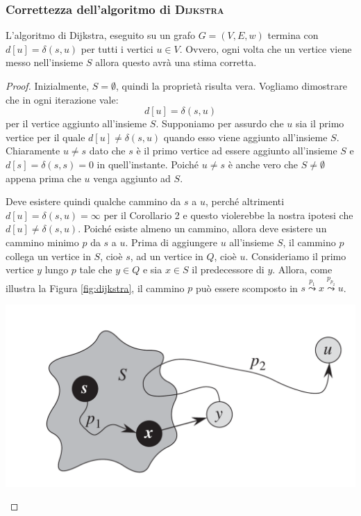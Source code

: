 \subsubsection{Correttezza dell'algoritmo di \textsc{Dijkstra}}

\begin{teorbox}
	L'algoritmo di Dijkstra, eseguito su un grafo $G=(V,E,w)$ termina con $d[u]=\delta(s,u)$ per tutti i vertici $u \in V$. Ovvero, ogni volta che un vertice viene messo nell'insieme $S$ allora questo avrà una stima corretta.
\end{teorbox}
\begin{proof}
	Inizialmente, $S = \emptyset$, quindi la proprietà risulta vera. Vogliamo dimostrare che in ogni iterazione vale:
\begin{displaymath}
	d[u] = \delta(s,u)
\end{displaymath}
per il vertice aggiunto all'insieme $S$. Supponiamo per assurdo che $u$ sia il primo vertice per il quale $d[u] \neq \delta(s,u)$ quando esso viene aggiunto all'insieme $S$. Chiaramente $u \neq s$ dato che $s$ è il primo vertice ad essere aggiunto all'insieme $S$ e $d[s]= \delta(s,s)=0$ in quell'instante. Poiché $u  \neq s$ è anche vero che $S \neq \emptyset$ appena prima che $u$ venga aggiunto ad $S$.

Deve esistere quindi qualche cammino da $s$ a $u$, perché altrimenti $d[u] = \delta(s,u) = \infty$ per il Corollario 2 e questo violerebbe la nostra ipotesi che $d[u] \neq \delta(s,u)$. Poiché esiste almeno un cammino, allora deve esistere un cammino minimo $p$ da $s$ a $u$. Prima di aggiungere $u$ all'insieme $S$, il cammino $p$ collega un vertice in $S$, cioè $s$, ad un vertice in $Q$, cioè $u$. Consideriamo il primo vertice $y$ lungo $p$ tale che $y \in Q$ e sia $x \in S$ il predecessore di $y$. Allora, come illustra la Figura \ref{fig:dijkstra}, il cammino $p$ può essere scomposto in $s \stackrel{p_{1}}{\leadsto} x \stackrel{p_{p_{2}}}{\leadsto} u$.

\begin{center}
	\includegraphics[scale=.2]{res/dijkstra}
	\label{fig:dijkstra}
\end{center}


\end{proof}
